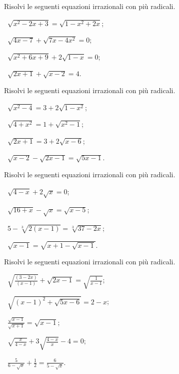 \begin{esercizio}[\Ast]
 \label{ese:8.15}
Risolvi le seguenti equazioni irrazionali con più radicali.
\begin{multicols}{2}
 \begin{enumeratea}
 \item~$\sqrt{x^2-2x+3}=\sqrt{1-x^2+2x}$;
 \item~$\sqrt{4x-7}+\sqrt{7x-4x^2}=0$;
 \item~$\sqrt{x^2+6x+9}+2\sqrt{1-x}=0$;
 \item~$\sqrt{2x+1}+\sqrt{x-2}=4$.
 \end{enumeratea}
 \end{multicols}
\end{esercizio}

\begin{esercizio}[\Ast]
 \label{ese:8.16}
Risolvi le seguenti equazioni irrazionali con più radicali.
\begin{multicols}{2}
 \begin{enumeratea}
 \item~$\sqrt{x^2-4}=3+2\sqrt{1-x^2}$;
 \item~$\sqrt{4+x^2}=1+\sqrt{x^2-1}$;
 \item~$\sqrt{2x+1}=3+2\sqrt{x-6}$;
 \item~$\sqrt{x-2}-\sqrt{2x-1}=\sqrt{5x-1}$.
 \end{enumeratea}
 \end{multicols}
\end{esercizio}
\pagebreak
\begin{esercizio}[\Ast]
 \label{ese:8.17}
Risolvi le seguenti equazioni irrazionali con più radicali.
\begin{multicols}{2}
 \begin{enumeratea}
 \item~$\sqrt{4-x}+2\sqrt{x}=0$;
 \item~$\sqrt{16+x}-\sqrt{x}=\sqrt{x-5}$;
 \item~$5-\sqrt[3]{2(x-1)}=\sqrt[3]{37-2x}$;
 \item~$\sqrt{x-1}=\sqrt{x+1-\sqrt{x-1}}$.
 \end{enumeratea}
 \end{multicols}
\end{esercizio}

\begin{esercizio}[\Ast]
 \label{ese:8.18}
Risolvi le seguenti equazioni irrazionali con più radicali.
\begin{multicols}{2}
 \begin{enumeratea}
 \item~$\sqrt{\frac{(3-2x)}{(x-1)}}+\sqrt{2x-1}=\sqrt{\frac 1{x-1}}$;
 \item~$\sqrt{(x-1)^2+\sqrt{5x-6}}=2-x$;
 \item~$\frac{\sqrt{x-1}}{\sqrt{x+1}}=\sqrt{x-1}$;
 \item~$\sqrt{\frac x{4-x}}+3\sqrt{\frac{4-x} x}-4=0$;
 \item~$\frac 5{6-\sqrt x}+\frac 1 2=\frac 6{5-\sqrt x}$.
 \end{enumeratea}
 \end{multicols}
\end{esercizio}

